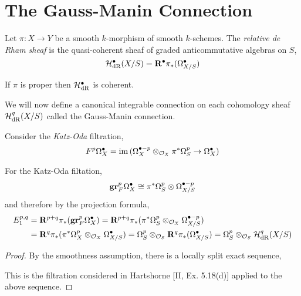 \documentclass[12pt]{article}
\begin{document}
\section{The Gauss-Manin Connection}

\begin{defn}
Let $\pi : X \to Y$ be a smooth $k$-morphism of smooth $k$-schemes. The \textit{relative de Rham sheaf} is the quasi-coherent sheaf of graded anticommutative algebras on $S$,
\[ \mathcal{H}_{\mathrm{dR}}^\bullet(X/S) = \mathbf{R}^\bullet \pi_* (\Omega^\bullet_{X/S}) \]
\end{defn}

\begin{rmk}
If $\pi$ is proper then $\mathcal{H}_{\mathrm{dR}}^\bullet$ is coherent.
\end{rmk}

We will now define a canonical integrable connection on each cohomology sheaf $\mathcal{H}_{\mathrm{dR}}^q(X/S)$ called the Gauss-Manin connection.

\begin{defn}
Consider the \textit{Katz-Oda} filtration,
\[ F^p \Omega^\bullet_{X} = \operatorname{\mathrm{im}}{(\Omega_X^{\bullet -p} \otimes_{\mathcal{O}_{X}} \pi^* \Omega_S^p \to \Omega_X^\bullet)} \]
\end{defn}

\begin{lemma}
For the Katz-Oda filtation,
\[ \mathbf{gr}^p_F \Omega^\bullet_X \cong \pi^{*}\Omega_S^p \otimes \Omega_{X/S}^{\bullet - p}  \]
and therefore by the projection formula,
\begin{align*}
E_1^{p,q} & = \mathbf{R}^{p+q} \pi_*(\mathbf{gr}^p_F \Omega_X^\bullet) = \mathbf{R}^{p+q} \pi_* (\pi^* \Omega^p_S \otimes_{\mathcal{O}_{X}} \Omega^{\bullet - p}_{X/S}) 
\\
& = \mathbf{R}^q \pi_* (\pi^* \Omega^p_X \otimes_{\mathcal{O}_{X}} \Omega_{X/S}^\bullet) = \Omega^p_{S} \otimes_{\mathcal{O}_{S}} \mathbf{R}^q \pi_* (\Omega^\bullet_{X/S}) = \Omega^p_S \otimes_{\mathcal{O}_{S}} \mathcal{H}_{\mathrm{dR}}^q(X/S) 
\end{align*}
\end{lemma}

\begin{proof}
By the smoothness assumption, there is a locally split exact sequence,
\begin{center}
\end{center}
This is the filtration considered in Hartshorne [II, Ex. 5.18(d)] applied to the above sequence. 
\end{proof}
\end{document}
